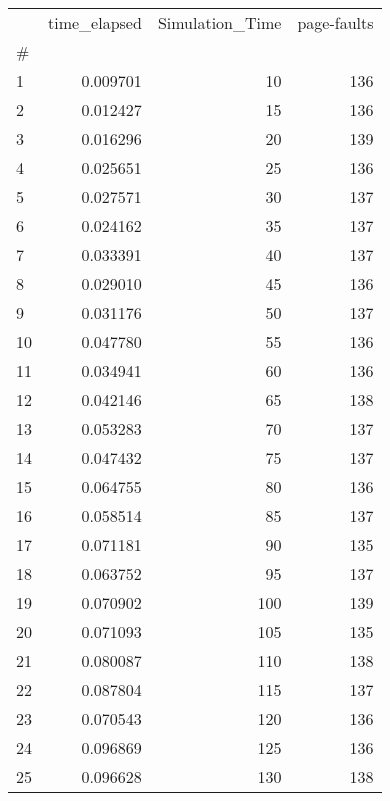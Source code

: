 \begin{tabular}{lrrr}
\toprule
{} &  time\_elapsed &  Simulation\_Time &  page-faults \\
\#  &               &                  &              \\
\midrule
1  &      0.009701 &               10 &          136 \\
2  &      0.012427 &               15 &          136 \\
3  &      0.016296 &               20 &          139 \\
4  &      0.025651 &               25 &          136 \\
5  &      0.027571 &               30 &          137 \\
6  &      0.024162 &               35 &          137 \\
7  &      0.033391 &               40 &          137 \\
8  &      0.029010 &               45 &          136 \\
9  &      0.031176 &               50 &          137 \\
10 &      0.047780 &               55 &          136 \\
11 &      0.034941 &               60 &          136 \\
12 &      0.042146 &               65 &          138 \\
13 &      0.053283 &               70 &          137 \\
14 &      0.047432 &               75 &          137 \\
15 &      0.064755 &               80 &          136 \\
16 &      0.058514 &               85 &          137 \\
17 &      0.071181 &               90 &          135 \\
18 &      0.063752 &               95 &          137 \\
19 &      0.070902 &              100 &          139 \\
20 &      0.071093 &              105 &          135 \\
21 &      0.080087 &              110 &          138 \\
22 &      0.087804 &              115 &          137 \\
23 &      0.070543 &              120 &          136 \\
24 &      0.096869 &              125 &          136 \\
25 &      0.096628 &              130 &          138 \\

\end{tabular}
